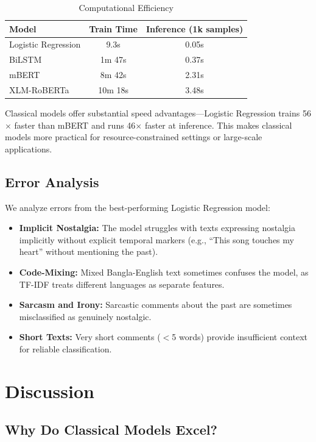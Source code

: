 \documentclass[conference]{IEEEtran}
\begin{document}
\begin{table}[h]
\centering
\caption{Computational Efficiency}
\label{tab:efficiency}
\begin{tabular}{lcc}
\toprule
\textbf{Model} & \textbf{Train Time} & \textbf{Inference (1k samples)} \\
\midrule
Logistic Regression & 9.3s & 0.05s \\
BiLSTM & 1m 47s & 0.37s \\
mBERT & 8m 42s & 2.31s \\
XLM-RoBERTa & 10m 18s & 3.48s \\
\bottomrule
\end{tabular}
\end{table}

Classical models offer substantial speed advantages—Logistic Regression trains 56$\times$ faster than mBERT and runs 46$\times$ faster at inference. This makes classical models more practical for resource-constrained settings or large-scale applications.

\subsection{Error Analysis}

We analyze errors from the best-performing Logistic Regression model:

\begin{itemize}
\item \textbf{Implicit Nostalgia:} The model struggles with texts expressing nostalgia implicitly without explicit temporal markers (e.g., ``This song touches my heart'' without mentioning the past).
\item \textbf{Code-Mixing:} Mixed Bangla-English text sometimes confuses the model, as TF-IDF treats different languages as separate features.
\item \textbf{Sarcasm and Irony:} Sarcastic comments about the past are sometimes misclassified as genuinely nostalgic.
\item \textbf{Short Texts:} Very short comments ($<$5 words) provide insufficient context for reliable classification.
\end{itemize}

\section{Discussion}

\subsection{Why Do Classical Models Excel?}
\end{document}
